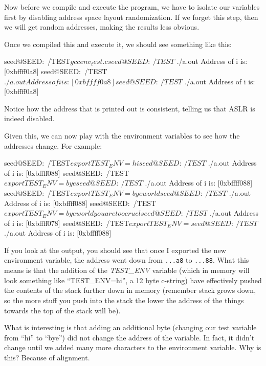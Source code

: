 Now before we compile and execute the program, we have to isolate our variables first by disabling address space layout randomization. If we forget this step, then we will get random addresses, making the results less obvious.


Once we compiled this and execute it, we should see something like this: 

\begin{code}
seed@SEED:~/TEST$ gcc env_test.c
seed@SEED:~/TEST$ ./a.out 
Address of i is: [0xbffff0a8]
seed@SEED:~/TEST$ ./a.out 
Address of i is: [0xbffff0a8]
seed@SEED:~/TEST$ ./a.out 
Address of i is: [0xbffff0a8]
\end{code}

Notice how the address that is printed out is consistent, telling us that ASLR is indeed disabled.

Given this, we can now play with the environment variables to see how the addresses change. For example:

\begin{code}
seed@SEED:~/TEST$ export TEST_ENV=hi
seed@SEED:~/TEST$ ./a.out 
Address of i is: [0xbffff088]
seed@SEED:~/TEST$ export TEST_ENV=bye
seed@SEED:~/TEST$ ./a.out 
Address of i is: [0xbffff088]
seed@SEED:~/TEST$ export TEST_ENV=byeworld
seed@SEED:~/TEST$ ./a.out 
Address of i is: [0xbffff088]
seed@SEED:~/TEST$ export TEST_ENV=byeworldyouaretoocruel
seed@SEED:~/TEST$ ./a.out 
Address of i is: [0xbffff078]
seed@SEED:~/TEST$ export TEST_ENV=
seed@SEED:~/TEST$ ./a.out 
Address of i is: [0xbffff088]
\end{code}

If you look at the output, you should see that once I exported the new environment variable, the address went down from {\tt ...a8} to {\tt ...88}. What this means is that the addition of the {\em TEST\_ENV} variable (which in memory will look something like ``TEST\_ENV=hi'', a 12 byte c-string) have effectively pushed the contents of the stack further down in memory (remember stack grows down, so the more stuff you push into the stack the lower the address of the things towards the top of the stack will be). 

What is interesting is that adding an additional byte (changing our test variable from ``hi'' to ``bye'') did not change the address of the variable. In fact, it didn’t change until we added many more characters to the environment variable. Why is this? Because of alignment. 

